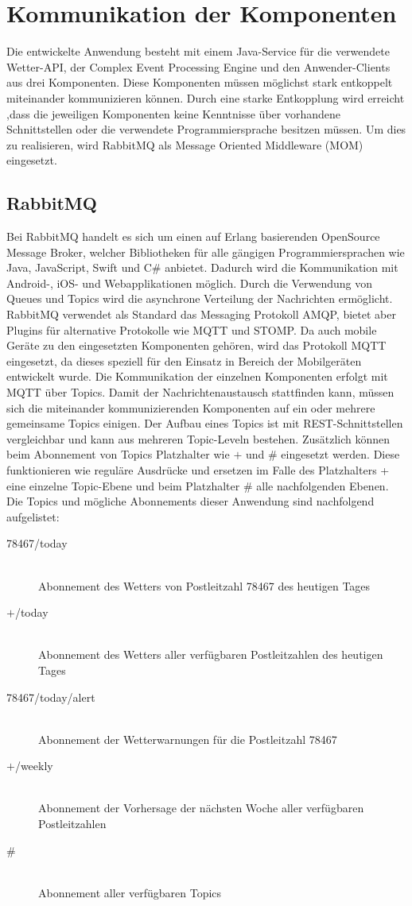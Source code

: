 \section{Kommunikation der Komponenten}
Die entwickelte Anwendung besteht mit einem Java-Service für die verwendete Wetter-API, der Complex Event Processing Engine und den Anwender-Clients aus drei Komponenten. Diese Komponenten müssen möglichst stark entkoppelt miteinander kommunizieren können. Durch eine starke Entkopplung wird erreicht ,dass die jeweiligen Komponenten keine Kenntnisse über vorhandene Schnittstellen oder die verwendete Programmiersprache besitzen müssen. Um dies zu realisieren, wird RabbitMQ als Message Oriented Middleware (MOM) eingesetzt. 
\subsection{RabbitMQ}\label{rabbitmq}
Bei RabbitMQ handelt es sich um einen auf Erlang basierenden OpenSource Message Broker, welcher Bibliotheken für alle gängigen Programmiersprachen wie Java, JavaScript, Swift und C\# anbietet. Dadurch wird die Kommunikation mit Android-, iOS- und Webapplikationen möglich. Durch die Verwendung von Queues und Topics wird die asynchrone Verteilung der Nachrichten ermöglicht. RabbitMQ verwendet als Standard das Messaging Protokoll AMQP, bietet aber Plugins für alternative Protokolle wie MQTT und STOMP. Da auch mobile Geräte zu den eingesetzten Komponenten gehören, wird das Protokoll MQTT eingesetzt, da dieses speziell für den Einsatz in Bereich der Mobilgeräten entwickelt wurde. Die Kommunikation der einzelnen Komponenten erfolgt mit MQTT über Topics. Damit der Nachrichtenaustausch stattfinden kann, müssen sich die miteinander kommunizierenden Komponenten auf ein oder mehrere gemeinsame Topics einigen. Der Aufbau eines Topics ist mit REST-Schnittstellen vergleichbar und kann aus mehreren Topic-Leveln bestehen. Zusätzlich können beim Abonnement von Topics Platzhalter wie $+$ und \# eingesetzt werden. Diese funktionieren wie reguläre Ausdrücke und ersetzen im Falle des Platzhalters + eine einzelne Topic-Ebene und beim Platzhalter \# alle nachfolgenden Ebenen. Die Topics und mögliche Abonnements dieser Anwendung sind nachfolgend aufgelistet:
\begin{description}
\item[78467/today]\hfill \\ Abonnement des Wetters von Postleitzahl 78467 des heutigen Tages
\item[$+$/today]\hfill \\ Abonnement des Wetters aller verfügbaren Postleitzahlen des heutigen Tages
\item[78467/today/alert]\hfill \\ Abonnement der Wetterwarnungen für die Postleitzahl 78467
\item[$+$/weekly]\hfill \\ Abonnement der Vorhersage der nächsten Woche aller verfügbaren Postleitzahlen
\item[\#]\hfill \\ Abonnement aller verfügbaren Topics
\end{description}
